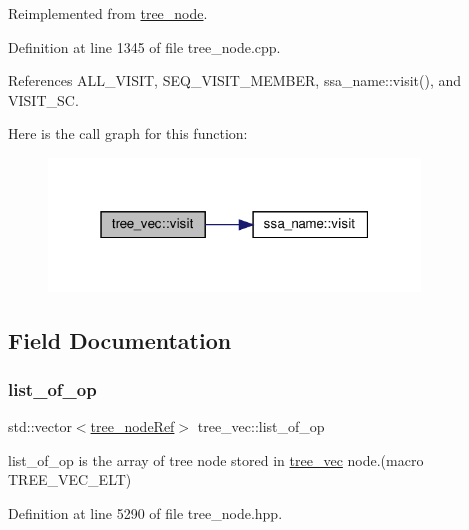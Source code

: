 Reimplemented from \hyperlink{classtree__node_aa9abba3f1b30e0be80b4a56b188c6ecc}{tree\+\_\+node}.



Definition at line 1345 of file tree\+\_\+node.\+cpp.



References A\+L\+L\+\_\+\+V\+I\+S\+IT, S\+E\+Q\+\_\+\+V\+I\+S\+I\+T\+\_\+\+M\+E\+M\+B\+ER, ssa\+\_\+name\+::visit(), and V\+I\+S\+I\+T\+\_\+\+SC.

Here is the call graph for this function\+:
\nopagebreak
\begin{figure}[H]
\begin{center}
\leavevmode
\includegraphics[width=280pt]{da/de7/structtree__vec_a6dfe22713c2cb390fe2c35f208d26872_cgraph}
\end{center}
\end{figure}


\subsection{Field Documentation}
\mbox{\label{structtree__vec_a3e6650d6f47251f64184c33b199064f8}} 
\subsubsection{\texorpdfstring{list\+\_\+of\+\_\+op}{list\_of\_op}}
{\footnotesize\ttfamily std\+::vector$<$\hyperlink{tree__node_8hpp_a6ee377554d1c4871ad66a337eaa67fd5}{tree\+\_\+node\+Ref}$>$ tree\+\_\+vec\+::list\+\_\+of\+\_\+op}



list\+\_\+of\+\_\+op is the array of tree node stored in \hyperlink{structtree__vec}{tree\+\_\+vec} node.(macro T\+R\+E\+E\+\_\+\+V\+E\+C\+\_\+\+E\+LT) 



Definition at line 5290 of file tree\+\_\+node.\+hpp.



